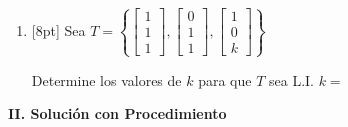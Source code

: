 \documentclass[11pt]{article}
\begin{document}
\begin{enumerate}
\vspace{4pt}
\noindent (b) $BA$ \dotfill\ es simétrica.

\vspace{4pt}
\noindent (c) $AA^T$ \dotfill\ es simétrica.

\item{}[8pt] Sea $T = \left\{\begin{bmatrix}1\\1\\1\end{bmatrix},\begin{bmatrix}0\\1\\1\end{bmatrix},\begin{bmatrix}1\\0\\k\end{bmatrix}\right\}$

\vspace{4pt}
\noindent Determine los valores de $k$ para que $T$ sea L.I. $k=$ \dotfill
\end{enumerate}

\vspace{6pt}
\begin{center}\textbf{II. Solución con Procedimiento}\end{center}
\end{document}
